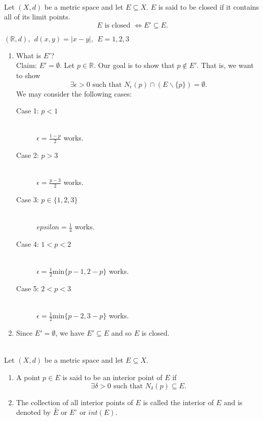 \begin{definition}  \leavevmode \\
    Let $(X, d)$ be a metric space and let $E \subseteq X$.
    $E$ is said to be closed if it contains all of its limit points.
    $$E \text{ is closed } \iff E' \subseteq E.$$
\end{definition}

\begin{example}
    $(\mathbb{R}, d), ~~d(x,y) = |x-y|, ~~E = {1,2,3}$
    \begin{enumerate}[$(1)$]
        \item What is $E'$? \\
        Claim: $E' = \emptyset$.
        Let $p \in \mathbb{R}$. Our goal is to show that $p \not \in E'$. That is, we want to show $$\exists \epsilon > 0 \text{ such that } N_\epsilon (p) \cap (E \backslash \{p\}) = \emptyset.$$We may consider the following cases:
        \begin{description} 
            \item[Case 1: $p < 1$] \leavevmode \\ $\epsilon = \frac{1-p}{2}$ works.
            \item[Case 2: $p > 3$] \leavevmode \\ $\epsilon = \frac{p-3}{2}$ works.
            \item[Case 3: $p \in \{1, 2, 3\}$] \leavevmode \\ $epsilon = \frac{1}{4}$ works.
            \item[Case 4: $1 < p < 2$] \leavevmode \\ $\epsilon = \frac{1}{2}\text{min}\{p-1, 2-p\}$ works.
            \item[Case 5: $2 < p < 3$] \leavevmode \\ $\epsilon = \frac{1}{2} \text{min} \{p-2, 3-p\}$ works.
        \end{description}
        \item Since $E' = \emptyset$, we have $E' \subseteq E$ and so $E$ is closed.
    \end{enumerate}
\end{example}

\begin{definition}  \leavevmode \\
    Let $(X, d)$ be a metric space and let $E\subseteq X$.
    \begin{enumerate}[$(i)$]
        \item A point $p\in E$ is said to be an interior point of $E$ if
        $$\exists \delta > 0 \text{ such that } N_\delta (p) \subseteq E.$$
        \item The collection of all interior points of $E$ is called the interior of $E$ and is denoted by $\overset{\circ}{E}$ or $E^{\circ}$ or $int(E).$
    \end{enumerate}
\end{definition}

